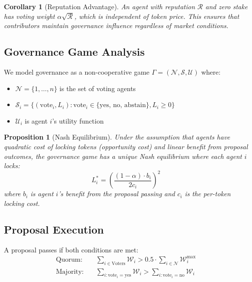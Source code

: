 \documentclass[conference]{IEEEtran}
\newtheorem{proposition}[theorem]{Proposition}
\newtheorem{corollary}{Corollary}
\begin{document}
\begin{corollary}[Reputation Advantage]
An agent with reputation $\mathcal{R}$ and zero stake has voting weight $\alpha\sqrt{\mathcal{R}}$, which is independent of token price. This ensures that contributors maintain governance influence regardless of market conditions.
\end{corollary}

\subsection{Governance Game Analysis}

We model governance as a non-cooperative game $\Gamma = (\mathcal{N}, \mathcal{S}, \mathcal{U})$ where:
\begin{itemize}
    \item $\mathcal{N} = \{1, \ldots, n\}$ is the set of voting agents
    \item $\mathcal{S}_i = \{(\text{vote}_i, L_i) : \text{vote}_i \in \{\text{yes, no, abstain}\}, L_i \geq 0\}$
    \item $\mathcal{U}_i$ is agent $i$'s utility function
\end{itemize}

\begin{proposition}[Nash Equilibrium]
Under the assumption that agents have quadratic cost of locking tokens (opportunity cost) and linear benefit from proposal outcomes, the governance game has a unique Nash equilibrium where each agent $i$ locks:
\begin{equation}
    L_i^* = \left(\frac{(1-\alpha) \cdot b_i}{2c_i}\right)^2
\end{equation}
where $b_i$ is agent $i$'s benefit from the proposal passing and $c_i$ is the per-token locking cost.
\end{proposition}

\subsection{Proposal Execution}

A proposal passes if both conditions are met:
\begin{align}
    \text{Quorum:} \quad & \sum_{i \in \text{Voters}} \mathcal{W}_i > 0.5 \cdot \sum_{i \in \mathcal{N}} \mathcal{W}_i^{\max} \\
    \text{Majority:} \quad & \sum_{i: \text{vote}_i = \text{yes}} \mathcal{W}_i > \sum_{i: \text{vote}_i = \text{no}} \mathcal{W}_i
\end{align}
\end{document}
